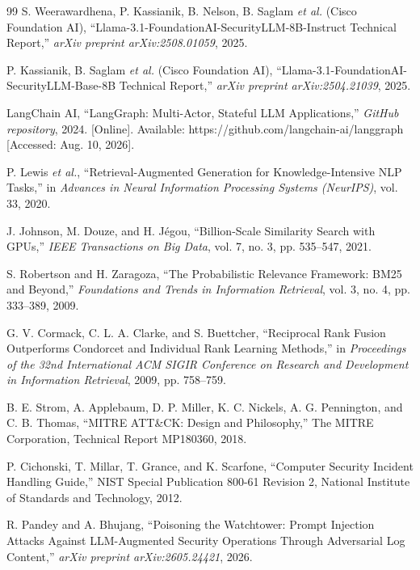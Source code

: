 \documentclass[12pt,a4paper]{report}
\begin{document}
\begin{thebibliography}{99}
S. Weerawardhena, P. Kassianik, B. Nelson, B. Saglam \textit{et al.} (Cisco Foundation AI), ``Llama-3.1-FoundationAI-SecurityLLM-8B-Instruct Technical Report,'' \textit{arXiv preprint arXiv:2508.01059}, 2025.

P. Kassianik, B. Saglam \textit{et al.} (Cisco Foundation AI), ``Llama-3.1-FoundationAI-SecurityLLM-Base-8B Technical Report,'' \textit{arXiv preprint arXiv:2504.21039}, 2025.

LangChain AI, ``LangGraph: Multi-Actor, Stateful LLM Applications,'' \textit{GitHub repository}, 2024. [Online]. Available: https://github.com/langchain-ai/langgraph [Accessed: Aug. 10, 2026].

P. Lewis \textit{et al.}, ``Retrieval-Augmented Generation for Knowledge-Intensive NLP Tasks,'' in \textit{Advances in Neural Information Processing Systems (NeurIPS)}, vol. 33, 2020.

J. Johnson, M. Douze, and H. Jégou, ``Billion-Scale Similarity Search with GPUs,'' \textit{IEEE Transactions on Big Data}, vol. 7, no. 3, pp. 535--547, 2021.

S. Robertson and H. Zaragoza, ``The Probabilistic Relevance Framework: BM25 and Beyond,'' \textit{Foundations and Trends in Information Retrieval}, vol. 3, no. 4, pp. 333--389, 2009.

G. V. Cormack, C. L. A. Clarke, and S. Buettcher, ``Reciprocal Rank Fusion Outperforms Condorcet and Individual Rank Learning Methods,'' in \textit{Proceedings of the 32nd International ACM SIGIR Conference on Research and Development in Information Retrieval}, 2009, pp. 758--759.

B. E. Strom, A. Applebaum, D. P. Miller, K. C. Nickels, A. G. Pennington, and C. B. Thomas, ``MITRE ATT\&CK: Design and Philosophy,'' The MITRE Corporation, Technical Report MP180360, 2018.

P. Cichonski, T. Millar, T. Grance, and K. Scarfone, ``Computer Security Incident Handling Guide,'' NIST Special Publication 800-61 Revision 2, National Institute of Standards and Technology, 2012.

R. Pandey and A. Bhujang, ``Poisoning the Watchtower: Prompt Injection Attacks Against LLM-Augmented Security Operations Through Adversarial Log Content,'' \textit{arXiv preprint arXiv:2605.24421}, 2026.


\end{thebibliography}
\end{document}
